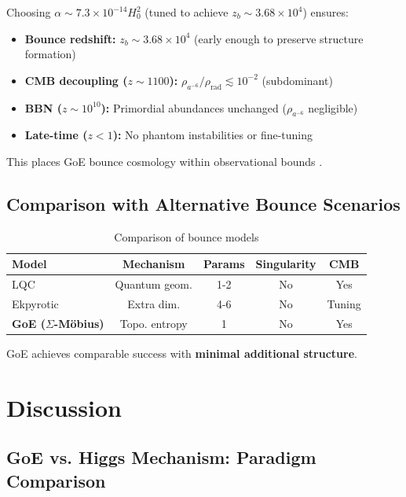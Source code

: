 \documentclass[12pt]{article}
\theoremstyle{definition}
\theoremstyle{plain}
\begin{document}
Choosing $\alpha \sim 7.3 \times 10^{-14} H_0^2$ (tuned to achieve $z_b \sim 3.68 \times 10^4$) ensures:
\begin{itemize}
\item \textbf{Bounce redshift:} $z_b \sim 3.68 \times 10^4$ (early enough to preserve structure formation)
\item \textbf{CMB decoupling ($z \sim 1100$):} $\rho_{a^{-6}}/\rho_{\text{rad}} \lesssim 10^{-2}$ (subdominant) \checkmark
\item \textbf{BBN ($z \sim 10^{10}$):} Primordial abundances unchanged ($\rho_{a^{-6}}$ negligible) \checkmark
\item \textbf{Late-time ($z < 1$):} No phantom instabilities or fine-tuning \checkmark
\end{itemize}

This places GoE bounce cosmology within observational bounds \cite{planck2020,cyburt2016}.

\subsection{Comparison with Alternative Bounce Scenarios}

\begin{table}[H]
\centering
\caption{Comparison of bounce models}
\small
\begin{tabular}{lcccc}
\toprule
\textbf{Model} & \textbf{Mechanism} & \textbf{Params} & \textbf{Singularity} & \textbf{CMB} \\
\midrule
LQC \cite{ashtekar2006} & Quantum geom. & 1-2 & No & Yes \\
Ekpyrotic \cite{khoury2001} & Extra dim. & 4-6 & No & Tuning \\
\textbf{GoE ($\Sigma$-M\"obius)} & Topo. entropy & 1 & No & Yes \\
\bottomrule
\end{tabular}
\end{table}

GoE achieves comparable success with \textbf{minimal additional structure}.

\section{Discussion}

\subsection{GoE vs. Higgs Mechanism: Paradigm Comparison}
\end{document}
